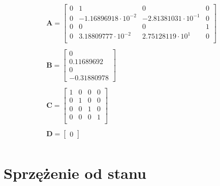 \documentclass{article}
\begin{document}
\begin{equation}\label{eq:ss_val}
 \begin{array}{l}
  \mathbf{A} = \begin{bmatrix}  0 & 1 & 0 & 0 \\
  							   0 & -1.16896918\cdot10^{-2} & -2.81381031\cdot10^{-1} & 0 \\
  							  0 & 0 & 0 & 1 \\
  							   0 & 3.18809777\cdot10^{-2} & 2.75128119\cdot10^{1} & 0 \\ 
  			   \end{bmatrix} \\ \\
  			   
  \mathbf{B} = \begin{bmatrix} 0 \\ 0.11689692 \\ 0 \\ -0.31880978 \end{bmatrix} \\ \\
  
  \mathbf{C} = \begin{bmatrix} 1 & 0 & 0 & 0 \\
  							   0 & 1 & 0 & 0 \\
  							   0 & 0 & 1 & 0 \\
  							   0 & 0 & 0 & 1 \\ 
  			   \end{bmatrix} \\ \\
  
  \mathbf{D} = \begin{bmatrix} 0 \end{bmatrix} \\
\end{array}
\end{equation}

\section{Sprzężenie od stanu}



\end{document}
